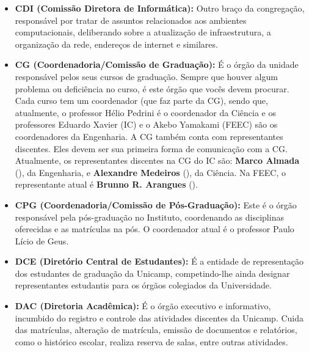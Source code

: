 \begin{itemize}
    \item  \textbf{CDI (Comissão Diretora de Informática):} Outro braço da
    congregação, responsável por tratar de assuntos relacionados aos ambientes
    computacionais, deliberando sobre a atualização de infraestrutura,
    a organização da rede, endereços de internet e similares.

    \item  \textbf{CG (Coordenadoria/Comissão de Graduação):} É o órgão da
    unidade responsável pelos seus cursos de graduação. Sempre que houver algum
    problema ou deficiência no curso, é este órgão que vocês devem procurar.
    Cada curso tem um coordenador (que faz parte da CG), sendo que, atualmente,
    o professor Hélio Pedrini é o coordenador da Ciência e os professores
    Eduardo Xavier (IC) e o Akebo Yamakami (FEEC) são os coordenadores da
    Engenharia. A CG também conta com representantes discentes. Eles devem ser
    sua primeira forma de comunicação com a CG. Atualmente, os representantes
    discentes na CG do IC são: \textbf{Marco Almada} (), da
    Engenharia, e \textbf{Alexandre Medeiros} (),
    da Ciência. Na FEEC, o representante atual é \textbf{Brunno R. Arangues}
    ().

    \item  \textbf{CPG (Coordenadoria/Comissão de Pós-Graduação):} Este
    é o órgão responsável pela pós-graduação no Instituto, coordenando as
    disciplinas oferecidas e as matrículas na pós. O coordenador atual
    é o professor Paulo Lício de Geus.

    \item  \textbf{DCE (Diretório Central de Estudantes):} É a entidade de
    representação dos estudantes de graduação da Unicamp, competindo-lhe ainda
    designar representantes estudantis para os órgãos colegiados da
    Universidade.

    \item  \textbf{DAC (Diretoria Acadêmica):} É o órgão executivo
    e informativo, incumbido do registro e controle das atividades discentes da
    Unicamp. Cuida das matrículas, alteração de matrícula, emissão de documentos
    e relatórios, como o histórico escolar, realiza reserva de salas, entre
    outras atividades.


\end{itemize}
